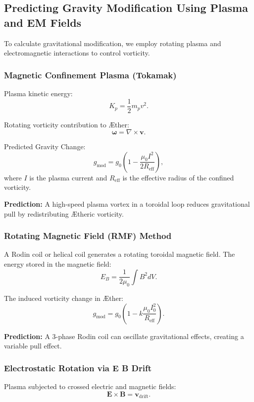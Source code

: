 \documentclass[a4paper,12pt]{article}
\begin{document}
\subsection{Predicting Gravity Modification Using Plasma and EM Fields}
To calculate gravitational modification, we employ rotating plasma and electromagnetic interactions to control vorticity.


\subsubsection{Magnetic Confinement Plasma (Tokamak)}
Plasma kinetic energy:
\begin{equation}
K_p = \frac{1}{2} m_p v^2.
\end{equation}


Rotating vorticity contribution to Æther:
\begin{equation}
\boldsymbol{\omega} = \nabla \times \mathbf{v}.
\end{equation}


Predicted Gravity Change:
\begin{equation}
g_\text{mod} = g_0 \left(1 - \frac{\mu_0 I^2}{2 R_\text{eff}} \right),
\end{equation}
where $I$ is the plasma current and $R_\text{eff}$ is the effective radius of the confined vorticity.


\textbf{Prediction:} A high-speed plasma vortex in a toroidal loop reduces gravitational pull by redistributing Ætheric vorticity.


\subsubsection{Rotating Magnetic Field (RMF) Method}
A Rodin coil or helical coil generates a rotating toroidal magnetic field. The energy stored in the magnetic field:
\begin{equation}
E_B = \frac{1}{2 \mu_0} \int B^2 dV.
\end{equation}


The induced vorticity change in Æther:
\begin{equation}
g_\text{mod} = g_0 \left(1 - k \frac{\mu_0 I_0^2}{R_\text{eff}} \right).
\end{equation}


\textbf{Prediction:} A 3-phase Rodin coil can oscillate gravitational effects, creating a variable pull effect.


\subsubsection{Electrostatic Rotation via \textbf{E} \texttimes \textbf{B} Drift}
Plasma subjected to crossed electric and magnetic fields:
\begin{equation}
\mathbf{E} \times \mathbf{B} = \mathbf{v}_\text{drift}.
\end{equation}
\end{document}
